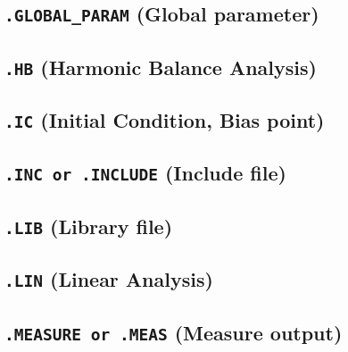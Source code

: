 \subsection{\texttt{.GLOBAL\_PARAM} (Global parameter)}


\newpage
\subsection{\texttt{.HB} (Harmonic Balance Analysis)}


\newpage
\subsection{\texttt{.IC} (Initial Condition, Bias point)}


\newpage
\subsection{\texttt{.INC or .INCLUDE} (Include file)}


\newpage
\subsection{\texttt{.LIB} (Library file)}


\newpage
\subsection{\texttt{.LIN} (Linear Analysis)}


\newpage
\subsection{\texttt{.MEASURE or .MEAS} (Measure output)}


